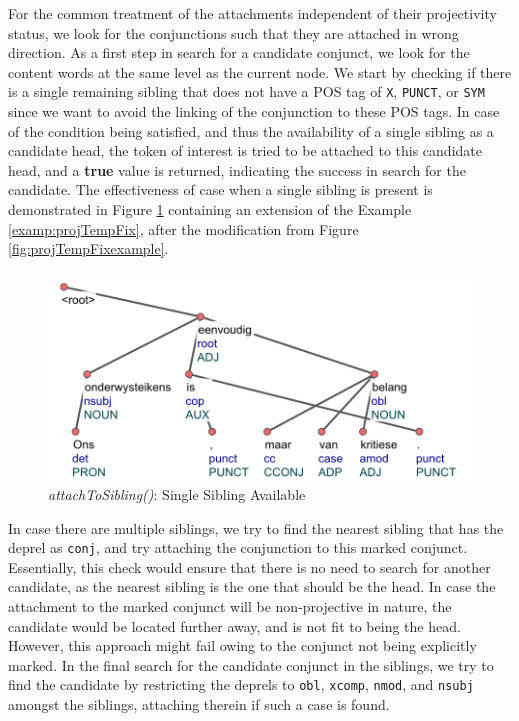 For the common treatment of the attachments independent of their projectivity status, we look for the conjunctions such that they are attached in wrong direction. As a first step in search for a candidate conjunct, we look for the content words at the same level as the current node. We start by checking if there is a single remaining sibling that does not have a POS tag of \verb|X|, \verb|PUNCT|, or \verb|SYM| since we want to avoid the linking of the conjunction to these POS tags. In case of the condition being satisfied, and thus the availability of a single sibling as a candidate head, the token of interest is tried to be attached to this candidate head, and a \textbf{true} value is returned, indicating the success in search for the candidate. The effectiveness of case when a single sibling is present is demonstrated in Figure \ref{fig:singleSiblingAttach} containing an extension of the Example \ref{examp:projTempFix}, after the modification from Figure \ref{fig:projTempFixexample}.

\begin{figure}[H]
    \centering
    \includegraphics{img/projTempFixFinal}
    \caption{\textit{attachToSibling()}: Single Sibling Available}
    \label{fig:singleSiblingAttach}
\end{figure}

In case there are multiple siblings, we try to find the nearest sibling that has the deprel as \verb|conj|, and try attaching the conjunction to this marked conjunct. Essentially, this check would ensure that there is no need to search for another candidate, as the nearest sibling is the one that should be the head. In case the attachment to the marked conjunct will be non-projective in nature, the candidate would be located further away, and is not fit to being the head. However, this approach might fail owing to the conjunct not being explicitly marked. In the final search for the candidate conjunct in the siblings, we try to find the candidate by restricting the deprels to \verb|obl|, \verb|xcomp|, \verb|nmod|, and \verb|nsubj| amongst the siblings, attaching therein if such a case is found. 

